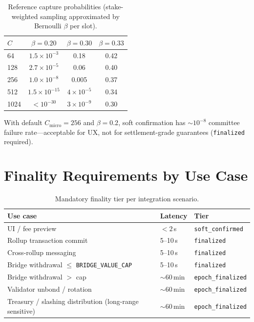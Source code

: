 \documentclass[11pt,a4paper,twoside]{report}
\theoremstyle{definition}
\begin{document}
\begin{table}[htbp]
  \centering
  \caption{Reference capture probabilities (stake-weighted sampling approximated by Bernoulli $\beta$ per slot).}
  \begin{tabular}{@{}l c c c@{}}
    \toprule
    $C$ & $\beta=0.20$ & $\beta=0.30$ & $\beta=0.33$ \\
    \midrule
    64 & $1.5 \times 10^{-3}$ & 0.18 & 0.42 \\
    128 & $2.7 \times 10^{-5}$ & 0.06 & 0.40 \\
    256 & $1.0 \times 10^{-8}$ & 0.005 & 0.37 \\
    512 & $1.5 \times 10^{-15}$ & $4 \times 10^{-5}$ & 0.34 \\
    1024 & $< 10^{-30}$ & $3 \times 10^{-9}$ & 0.30 \\
    \bottomrule
  \end{tabular}
\end{table}

\noindent With default $C_{\mathrm{micro}}=256$ and $\beta=0.2$, soft confirmation has $\sim 10^{-8}$ committee failure rate---acceptable for UX, not for settlement-grade guarantees (\texttt{finalized} required).

\chapter{Finality Requirements by Use Case}
\label{app:usecases}

\begin{table}[htbp]
  \centering
  \small
  \caption{Mandatory finality tier per integration scenario.}
  \begin{tabular}{@{}p{5.2cm} p{2.4cm} p{5.8cm}@{}}
    \toprule
          \textbf{Use case} & \textbf{Latency} & \textbf{Tier} \\
    \midrule
    UI / fee preview & $<2$\,s & \texttt{soft\_confirmed} \\
    Rollup transaction commit & 5--10\,s & \texttt{finalized} \\
    Cross-rollup messaging & 5--10\,s & \texttt{finalized} \\
    Bridge withdrawal $\leq$ \texttt{BRIDGE\_VALUE\_CAP} & 5--10\,s & \texttt{finalized} \\
    Bridge withdrawal $>$ cap & $\sim$60\,min & \texttt{epoch\_finalized} \\
    Validator unbond / rotation & $\sim$60\,min & \texttt{epoch\_finalized} \\
    Treasury / slashing distribution (long-range sensitive) & $\sim$60\,min & \texttt{epoch\_finalized} \\
    \bottomrule
  \end{tabular}
\end{table}
\end{document}
